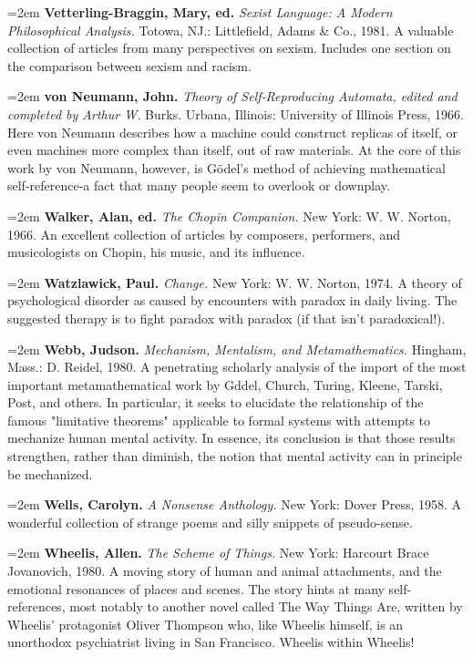 \par\noindent\hangindent=2em {\bf Vetterling-Braggin, Mary, ed.} {\it Sexist Language: A Modern Philosophical Analysis.} Totowa, NJ.: Littlefield, Adams \& Co., 1981. A valuable collection of articles from many perspectives on sexism. Includes one section on the comparison between sexism and racism.

\par\noindent\hangindent=2em {\bf von Neumann, John.} {\it Theory of Self-Reproducing Automata, edited and completed by Arthur W.} Burks. Urbana, Illinois: University of Illinois Press, 1966. Here von Neumann describes how a machine could construct replicas of itself, or even machines more complex than itself, out of raw materials. At the core of this work by von Neumann, however, is Gödel’s method of achieving mathematical self-reference-a fact that many people seem to overlook or downplay.

\par\noindent\hangindent=2em {\bf Walker, Alan, ed.} {\it The Chopin Companion.} New York: W. W. Norton, 1966. An excellent collection of articles by composers, performers, and musicologists on Chopin, his music, and its influence.

\par\noindent\hangindent=2em {\bf Watzlawick, Paul.} {\it Change.} New York: W. W. Norton, 1974. A theory of psychological disorder as caused by encounters with paradox in daily living. The suggested therapy is to fight paradox with paradox (if that isn't paradoxical!).

\par\noindent\hangindent=2em {\bf Webb, Judson.} {\it Mechanism, Mentalism, and Metamathematics.} Hingham, Mass.: D. Reidel, 1980. A penetrating scholarly analysis of the import of the most important metamathematical work by Gddel, Church, Turing, Kleene, Tarski, Post, and others. In particular, it seeks to elucidate the relationship of the famous "limitative theorems" applicable to formal systems with attempts to mechanize human mental activity. In essence, its conclusion is that those results strengthen, rather than diminish, the notion that mental activity can in principle be mechanized.

\par\noindent\hangindent=2em {\bf Wells, Carolyn.} {\it A Nonsense Anthology.} New York: Dover Press, 1958. A wonderful collection of strange poems and silly snippets of pseudo-sense.

\par\noindent\hangindent=2em {\bf Wheelis, Allen.} {\it The Scheme of Things.} New York: Harcourt Brace Jovanovich, 1980. A moving story of human and animal attachments, and the emotional resonances of places and scenes. The story hints at many self-references, most notably to another novel called The Way Things Are, written by Wheelis' protagonist Oliver Thompson who, like Wheelis himself, is an unorthodox psychiatrist living in San Francisco. Wheelis within Wheelis!

